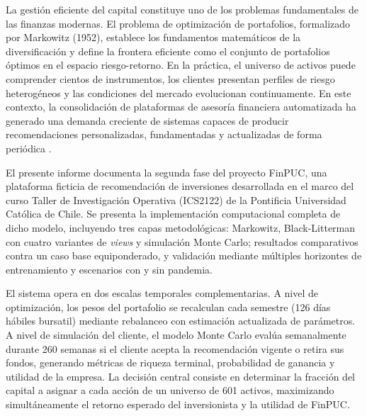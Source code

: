 La gesti\'on eficiente del capital constituye uno de los problemas
fundamentales de las finanzas modernas. El problema de optimizaci\'on de
portafolios, formalizado por Markowitz (1952), establece los fundamentos
matem\'aticos de la diversificaci\'on y define la frontera eficiente como el
conjunto de portafolios \'optimos en el espacio riesgo-retorno. En la
pr\'actica, el universo de activos puede comprender cientos de instrumentos,
los clientes presentan perfiles de riesgo heterog\'eneos y las condiciones del
mercado evolucionan continuamente. En este contexto, la consolidaci\'on de
plataformas de asesor\'ia financiera automatizada ha generado una demanda
creciente de sistemas capaces de producir recomendaciones personalizadas,
fundamentadas y actualizadas de forma peri\'odica \cite{dacunto2019}.

El presente informe documenta la segunda fase del proyecto FinPUC, una
plataforma ficticia de recomendaci\'on de inversiones desarrollada en el marco
del curso Taller de Investigaci\'on Operativa (ICS2122) de la Pontificia
Universidad Cat\'olica de Chile. Se presenta la implementaci\'on computacional completa de dicho modelo,
incluyendo tres capas metodol\'ogicas: Markowitz, Black-Litterman con cuatro variantes de \textit{views} y simulaci\'on Monte Carlo; resultados
comparativos contra un caso base equiponderado, y validaci\'on mediante
m\'ultiples horizontes de entrenamiento y escenarios con y sin pandemia.

El sistema opera en dos escalas temporales complementarias. A nivel de
optimizaci\'on, los pesos del portafolio se recalculan cada semestre (126
d\'ias h\'abiles bursatil) mediante rebalanceo con estimaci\'on actualizada de
par\'ametros. A nivel de simulaci\'on del cliente, el modelo Monte Carlo
eval\'ua semanalmente durante 260 semanas si el cliente acepta la
recomendaci\'on vigente o retira sus fondos, generando m\'etricas de riqueza
terminal, probabilidad de ganancia y utilidad de la empresa. La decisi\'on
central consiste en determinar la fracci\'on del capital a asignar a cada
acci\'on de un universo de 601 activos, maximizando simult\'aneamente el
retorno esperado del inversionista y la utilidad de FinPUC.
